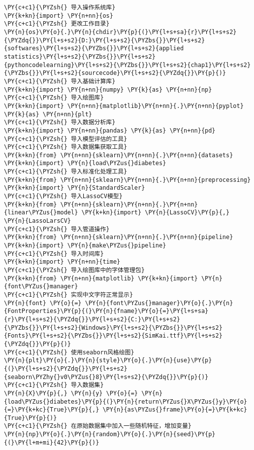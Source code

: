 \begin{Verbatim}[commandchars=\\\{\}]
\PY{c+c1}{\PYZsh{} 导入操作系统库}
\PY{k+kn}{import} \PY{n+nn}{os}
\PY{c+c1}{\PYZsh{} 更改工作目录}
\PY{n}{os}\PY{o}{.}\PY{n}{chdir}\PY{p}{(}\PY{l+s+sa}{r}\PY{l+s+s2}{\PYZdq{}}\PY{l+s+s2}{D:}\PY{l+s+s2}{\PYZbs{}}\PY{l+s+s2}{softwares}\PY{l+s+s2}{\PYZbs{}}\PY{l+s+s2}{applied statistics}\PY{l+s+s2}{\PYZbs{}}\PY{l+s+s2}{pythoncodelearning}\PY{l+s+s2}{\PYZbs{}}\PY{l+s+s2}{chap1}\PY{l+s+s2}{\PYZbs{}}\PY{l+s+s2}{sourcecode}\PY{l+s+s2}{\PYZdq{}}\PY{p}{)}
\PY{c+c1}{\PYZsh{} 导入基础计算库}
\PY{k+kn}{import} \PY{n+nn}{numpy} \PY{k}{as} \PY{n+nn}{np}
\PY{c+c1}{\PYZsh{} 导入绘图库}
\PY{k+kn}{import} \PY{n+nn}{matplotlib}\PY{n+nn}{.}\PY{n+nn}{pyplot} \PY{k}{as} \PY{n+nn}{plt}
\PY{c+c1}{\PYZsh{} 导入数据分析库}
\PY{k+kn}{import} \PY{n+nn}{pandas} \PY{k}{as} \PY{n+nn}{pd}
\PY{c+c1}{\PYZsh{} 导入模型评估的工具}
\PY{c+c1}{\PYZsh{} 导入数据集获取工具}
\PY{k+kn}{from} \PY{n+nn}{sklearn}\PY{n+nn}{.}\PY{n+nn}{datasets} \PY{k+kn}{import} \PY{n}{load\PYZus{}diabetes}
\PY{c+c1}{\PYZsh{} 导入标准化处理工具}
\PY{k+kn}{from} \PY{n+nn}{sklearn}\PY{n+nn}{.}\PY{n+nn}{preprocessing} \PY{k+kn}{import} \PY{n}{StandardScaler}
\PY{c+c1}{\PYZsh{} 导入LassoCV模型}
\PY{k+kn}{from} \PY{n+nn}{sklearn}\PY{n+nn}{.}\PY{n+nn}{linear\PYZus{}model} \PY{k+kn}{import} \PY{n}{LassoCV}\PY{p}{,} \PY{n}{LassoLarsCV}
\PY{c+c1}{\PYZsh{} 导入管道操作}
\PY{k+kn}{from} \PY{n+nn}{sklearn}\PY{n+nn}{.}\PY{n+nn}{pipeline} \PY{k+kn}{import} \PY{n}{make\PYZus{}pipeline}
\PY{c+c1}{\PYZsh{} 导入时间库}
\PY{k+kn}{import} \PY{n+nn}{time}
\PY{c+c1}{\PYZsh{} 导入绘图库中的字体管理包}
\PY{k+kn}{from} \PY{n+nn}{matplotlib} \PY{k+kn}{import} \PY{n}{font\PYZus{}manager}
\PY{c+c1}{\PYZsh{} 实现中文字符正常显示}
\PY{n}{font} \PY{o}{=} \PY{n}{font\PYZus{}manager}\PY{o}{.}\PY{n}{FontProperties}\PY{p}{(}\PY{n}{fname}\PY{o}{=}\PY{l+s+sa}{r}\PY{l+s+s2}{\PYZdq{}}\PY{l+s+s2}{C:}\PY{l+s+s2}{\PYZbs{}}\PY{l+s+s2}{Windows}\PY{l+s+s2}{\PYZbs{}}\PY{l+s+s2}{Fonts}\PY{l+s+s2}{\PYZbs{}}\PY{l+s+s2}{SimKai.ttf}\PY{l+s+s2}{\PYZdq{}}\PY{p}{)}
\PY{c+c1}{\PYZsh{} 使用seaborn风格绘图}
\PY{n}{plt}\PY{o}{.}\PY{n}{style}\PY{o}{.}\PY{n}{use}\PY{p}{(}\PY{l+s+s2}{\PYZdq{}}\PY{l+s+s2}{seaborn\PYZhy{}v0\PYZus{}8}\PY{l+s+s2}{\PYZdq{}}\PY{p}{)}
\PY{c+c1}{\PYZsh{} 导入数据集}
\PY{n}{X}\PY{p}{,} \PY{n}{y} \PY{o}{=} \PY{n}{load\PYZus{}diabetes}\PY{p}{(}\PY{n}{return\PYZus{}X\PYZus{}y}\PY{o}{=}\PY{k+kc}{True}\PY{p}{,} \PY{n}{as\PYZus{}frame}\PY{o}{=}\PY{k+kc}{True}\PY{p}{)}
\PY{c+c1}{\PYZsh{} 在原始数据集中加入一些随机特征，增加变量}
\PY{n}{np}\PY{o}{.}\PY{n}{random}\PY{o}{.}\PY{n}{seed}\PY{p}{(}\PY{l+m+mi}{42}\PY{p}{)}

\end{Verbatim}
